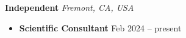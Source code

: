 {\color{black}\textbf{Independent} \hfill \textit{Fremont, CA, USA}}\par
\begin{itemize}
    \item
        \textbf{Scientific Consultant}
        \hfill  {Feb 2024 -- present} \par
\end{itemize}